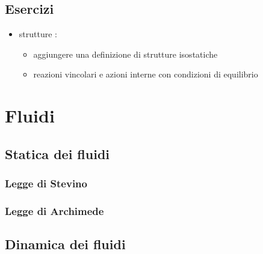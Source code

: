 \documentclass[letterpaper,10pt,italian]{jupyterBook}
\begin{document}
\section{Esercizi}
\label{\detokenize{ch/continuum/solids:esercizi}}\begin{itemize}
\item {} 
\sphinxAtStartPar
strutture :
\begin{itemize}
\item {} 
\sphinxAtStartPar
aggiungere una definizione di strutture isostatiche

\item {} 
\sphinxAtStartPar
reazioni vincolari e azioni interne con condizioni di equilibrio

\end{itemize}

\end{itemize}

\sphinxstepscope


\chapter{Fluidi}
\label{\detokenize{ch/continuum/fluids:fluidi}}\label{\detokenize{ch/continuum/fluids:continuum-fluids}}\label{\detokenize{ch/continuum/fluids::doc}}

\section{Statica dei fluidi}
\label{\detokenize{ch/continuum/fluids:statica-dei-fluidi}}\label{\detokenize{ch/continuum/fluids:fluids-statics}}

\subsection{Legge di Stevino}
\label{\detokenize{ch/continuum/fluids:legge-di-stevino}}\label{\detokenize{ch/continuum/fluids:fluids-statics-stevino}}

\subsection{Legge di Archimede}
\label{\detokenize{ch/continuum/fluids:legge-di-archimede}}\label{\detokenize{ch/continuum/fluids:fluids-statics-archimedes}}

\section{Dinamica dei fluidi}
\label{\detokenize{ch/continuum/fluids:dinamica-dei-fluidi}}\label{\detokenize{ch/continuum/fluids:fluids-dynamics}}
\end{document}
